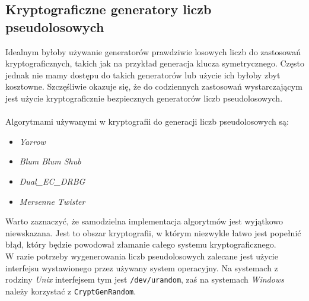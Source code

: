 \subsection{Kryptograficzne generatory liczb pseudolosowych}
Idealnym byłoby używanie generatorów prawdziwie losowych liczb do zastosowań kryptograficznych, takich 
jak na przykład generacja klucza symetrycznego. Często jednak nie mamy dostępu do takich generatorów
lub użycie ich byłoby zbyt kosztowne. Szczęśliwie okazuje się, że do codziennych zastosowań 
wystarczającym jest użycie kryptograficznie bezpiecznych generatorów liczb pseudolosowych. \\ \\
Algorytmami używanymi w kryptografii do generacji liczb pseudolosowych są:
\begin{itemize}
	\item \textit{Yarrow}
	\item \textit{Blum Blum Shub}
	\item \textit{Dual\_EC\_DRBG}
	\item \textit{Mersenne Twister}
\end{itemize}
Warto zaznaczyć, że samodzielna implementacja algorytmów jest wyjątkowo niewskazana. 
Jest to obszar kryptografii, w którym niezwykle łatwo jest popełnić błąd, który
będzie powodował złamanie całego systemu kryptograficznego. \\
W razie potrzeby wygenerowania liczb pseudolosowych zalecane jest użycie interfejsu 
wystawionego przez używany system operacyjny. Na systemach z rodziny \textit{Unix}
interfejsem tym jest \texttt{/dev/urandom}, zaś na systemach \textit{Windows} należy korzystać
z \texttt{CryptGenRandom}.
